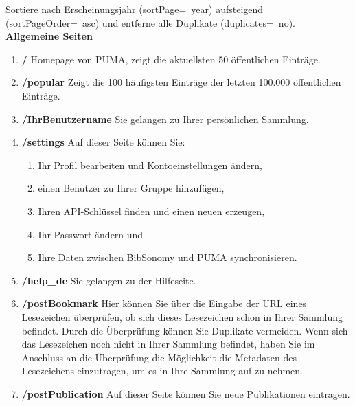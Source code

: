 Sortiere nach Erscheinungsjahr (sortPage=~year) aufsteigend (sortPageOrder=~asc) und entferne alle Duplikate (duplicates=~no). \newline
\newline
\textbf{Allgemeine Seiten}
\begin{enumerate}
    \item \textbf{/} \newline
    Homepage von PUMA, zeigt die aktuellsten 50 öffentlichen Einträge.
    \item \textbf{/popular} \newline
    Zeigt die 100 häufigsten Einträge der letzten 100.000 öffentlichen Einträge.
    \item \textbf{/IhrBenutzername} \newline
    Sie gelangen zu Ihrer persönlichen Sammlung.
    \item \textbf{/settings} \newline
    Auf dieser Seite können Sie:
    \begin{enumerate}
        \item Ihr Profil bearbeiten und Kontoeinstellungen ändern,
        \item einen Benutzer zu Ihrer Gruppe hinzufügen,
        \item Ihren API-Schlüssel finden und einen neuen erzeugen,
        \item Ihr Passwort ändern und
        \item Ihre Daten zwischen BibSonomy und PUMA synchronisieren.
    \end{enumerate}
    \item \textbf{/help\_de} \newline
    Sie gelangen zu der Hilfeseite.
    \item \textbf{/postBookmark} \newline
    Hier können Sie über die Eingabe der URL eines Lesezeichen überprüfen, ob sich dieses Lesezeichen schon in Ihrer Sammlung befindet. Durch die Überprüfung können Sie Duplikate vermeiden. Wenn sich das Lesezeichen noch nicht in Ihrer Sammlung befindet, haben Sie im Anschluss an die Überprüfung die Möglichkeit die Metadaten des Lesezeichens einzutragen, um es in Ihre Sammlung auf zu nehmen.
    \item \textbf{/postPublication} \newline
    Auf dieser Seite können Sie neue Publikationen eintragen. 

\end{enumerate}
